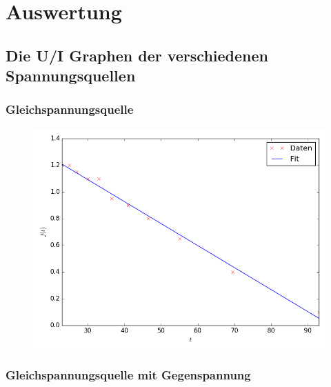\section{Auswertung}
\label{sec:Auswertung}



\subsection{Die U/I Graphen der verschiedenen Spannungsquellen}

\subsubsection{Gleichspannungsquelle}
\begin{figure}[H]
	\centering
	\caption{}
	\includegraphics[width=\linewidth-150pt,height=\textheight-150pt,keepaspectratio]{Gleichstrom.png}
	\label{fig:Gleichstrom}
\end{figure}


\newpage
\subsubsection{Gleichspannungsquelle mit Gegenspannung}

